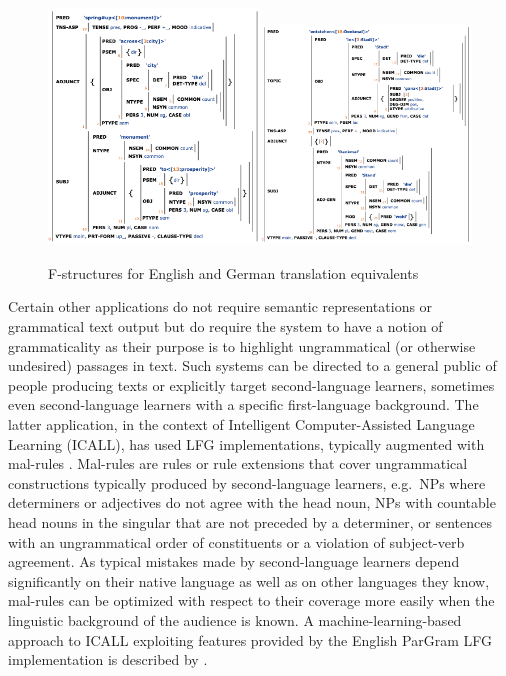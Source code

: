 \documentclass[output=paper,hidelinks]{langscibook}
\begin{document}
\begin{figure}[ht]
\caption{F-structures for English and German translation equivalents\label{fig:mt}}
\includegraphics[width=0.5\textwidth]{figures/EnglishFStr.png}\includegraphics[width=0.5\textwidth]{figures/GermanFStr.png}
\end{figure}


Certain other applications do not require semantic representations or grammatical text output but do require the system to have a notion of grammaticality as their purpose is to highlight ungrammatical (or otherwise undesired) passages in text. Such systems can  be directed to a general public of people producing texts  or explicitly target second-language learners, sometimes even second-language learners with a specific first-language background. The latter application, in the context of Intelligent Computer-Assisted Language Learning (ICALL), has used LFG implementations, typically augmented with  mal-rules \citep{rypaetal95,reuer03,khader03,fortmannforst04}. Mal-rules are rules or rule extensions that cover ungrammatical constructions typically produced by second-language learners, e.g.\ NPs where determiners or adjectives do not agree with the head noun, NPs with countable head nouns in the singular that are not preceded by a determiner, or sentences with an ungrammatical order of constituents or a violation of subject-verb agreement. As typical mistakes made by second-language learners depend significantly on their native language as well as on other languages they know, mal-rules can be optimized with respect to their coverage  more easily when the linguistic background of the audience is known. A machine-learning-based approach to ICALL exploiting features provided by the English ParGram LFG implementation is described by \cite{berendetal13}.
\end{document}
